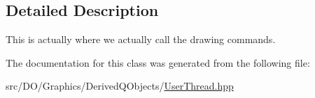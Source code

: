 \subsection{Detailed Description}
This is actually where we actually call the drawing commands. 

The documentation for this class was generated from the following file\-:\begin{DoxyCompactItemize}
\item 
src/\-D\-O/\-Graphics/\-Derived\-Q\-Objects/\hyperlink{_user_thread_8hpp}{User\-Thread.\-hpp}\end{DoxyCompactItemize}
